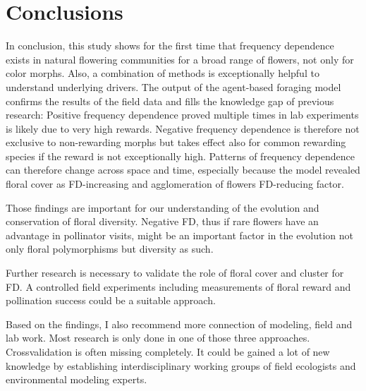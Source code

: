 \section{Conclusions}
\label{ch:conclusions}
In conclusion, this study shows for the first time that frequency dependence exists in natural flowering communities for a broad range of flowers, not only for color morphs. Also, a combination of methods is exceptionally helpful to understand underlying drivers. The output of the agent-based foraging model confirms the results of the field data and fills the knowledge gap of previous research: Positive frequency dependence proved multiple times in lab experiments is likely due to very high rewards. Negative frequency dependence is therefore not exclusive to non-rewarding morphs but takes effect also for common rewarding species if the reward is not exceptionally high. Patterns of frequency dependence can therefore change across space and time, especially because the model revealed floral cover as FD-increasing and agglomeration of flowers FD-reducing factor.

Those findings are important for our understanding of the evolution and conservation of floral diversity. Negative FD, thus if rare flowers have an advantage in pollinator visits, might be an important factor in the evolution not only floral polymorphisms but diversity as such. 

Further research is necessary to validate the role of floral cover and cluster for FD. A controlled field experiments including measurements of floral reward and pollination success could be a suitable approach. 

Based on the findings, I also recommend more connection of modeling, field and lab work. Most research is only done in one of those three approaches. Crossvalidation is often missing completely. It could be gained a lot of new knowledge by establishing interdisciplinary working groups of field ecologists and environmental modeling experts. 



